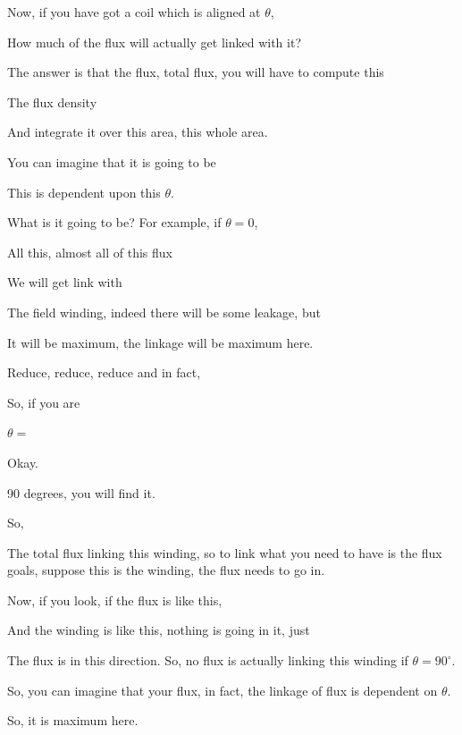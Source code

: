 \documentclass{article}
\begin{document}
Now, if you have got a coil which is aligned at $\theta$,

How much of the flux will actually get linked with it?

The answer is that the flux, total flux, you will have to compute this

The flux density

And integrate it over this area, this whole area.

You can imagine that it is going to be

This is dependent upon this $\theta$.

What is it going to be? For example, if $\theta = 0$,

All this, almost all of this flux

We will get link with

The field winding, indeed there will be some leakage, but

It will be maximum, the linkage will be maximum here.

Reduce, reduce, reduce and in fact,

So, if you are

$\theta =$

Okay.



90 degrees, you will find it.



So,

The total flux linking this winding, so to link what you need to have is the flux goals, suppose this is the winding, the flux needs to go in.

Now, if you look, if the flux is like this,

And the winding is like this, nothing is going in it, just

The flux is in this direction. So, no flux is actually linking this winding if $\theta = 90^\circ$.

So, you can imagine that your flux, in fact, the linkage of flux is dependent on $\theta$.

So, it is maximum here.
\end{document}
